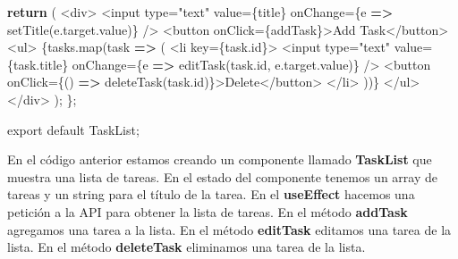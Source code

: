 \documentclass[
  a4paper,
  DIV=11,
  numbers=noendperiod,
  onepage,
  openany]{scrreprt}
\newenvironment{Shaded}{\begin{snugshade}}{\end{snugshade}}
\newcommand{\AttributeTok}[1]{\textcolor[rgb]{0.40,0.45,0.13}{#1}}
\newcommand{\ControlFlowTok}[1]{\textcolor[rgb]{0.00,0.23,0.31}{\textbf{#1}}}
\newcommand{\FunctionTok}[1]{\textcolor[rgb]{0.28,0.35,0.67}{#1}}
\newcommand{\ImportTok}[1]{\textcolor[rgb]{0.00,0.46,0.62}{#1}}
\newcommand{\KeywordTok}[1]{\textcolor[rgb]{0.00,0.23,0.31}{\textbf{#1}}}
\newcommand{\NormalTok}[1]{\textcolor[rgb]{0.00,0.23,0.31}{#1}}
\newcommand{\OperatorTok}[1]{\textcolor[rgb]{0.37,0.37,0.37}{#1}}
\newcommand{\StringTok}[1]{\textcolor[rgb]{0.13,0.47,0.30}{#1}}
\begin{document}
\begin{tcolorbox}
\begin{Shaded}
\begin{Highlighting}[]
  \ControlFlowTok{return}\NormalTok{ (}
    \OperatorTok{\textless{}}\NormalTok{div}\OperatorTok{\textgreater{}}
      \OperatorTok{\textless{}}\NormalTok{input type}\OperatorTok{=}\StringTok{"text"}\NormalTok{ value}\OperatorTok{=}\NormalTok{\{title\} onChange}\OperatorTok{=}\NormalTok{\{e }\KeywordTok{=\textgreater{}} \FunctionTok{setTitle}\NormalTok{(e}\OperatorTok{.}\AttributeTok{target}\OperatorTok{.}\AttributeTok{value}\NormalTok{)\} }\OperatorTok{/\textgreater{}}
      \OperatorTok{\textless{}}\NormalTok{button onClick}\OperatorTok{=}\NormalTok{\{addTask\}}\OperatorTok{\textgreater{}}\NormalTok{Add Task}\OperatorTok{\textless{}/}\NormalTok{button}\OperatorTok{\textgreater{}}
      \OperatorTok{\textless{}}\NormalTok{ul}\OperatorTok{\textgreater{}}
\NormalTok{        \{tasks}\OperatorTok{.}\FunctionTok{map}\NormalTok{(task }\KeywordTok{=\textgreater{}}\NormalTok{ (}
          \OperatorTok{\textless{}}\NormalTok{li key}\OperatorTok{=}\NormalTok{\{task}\OperatorTok{.}\AttributeTok{id}\NormalTok{\}}\OperatorTok{\textgreater{}}
            \OperatorTok{\textless{}}\NormalTok{input type}\OperatorTok{=}\StringTok{"text"}\NormalTok{ value}\OperatorTok{=}\NormalTok{\{task}\OperatorTok{.}\AttributeTok{title}\NormalTok{\} onChange}\OperatorTok{=}\NormalTok{\{e }\KeywordTok{=\textgreater{}} \FunctionTok{editTask}\NormalTok{(task}\OperatorTok{.}\AttributeTok{id}\OperatorTok{,}\NormalTok{ e}\OperatorTok{.}\AttributeTok{target}\OperatorTok{.}\AttributeTok{value}\NormalTok{)\} }\OperatorTok{/\textgreater{}}
            \OperatorTok{\textless{}}\NormalTok{button onClick}\OperatorTok{=}\NormalTok{\{() }\KeywordTok{=\textgreater{}} \FunctionTok{deleteTask}\NormalTok{(task}\OperatorTok{.}\AttributeTok{id}\NormalTok{)\}}\OperatorTok{\textgreater{}}\NormalTok{Delete}\OperatorTok{\textless{}/}\NormalTok{button}\OperatorTok{\textgreater{}}
          \OperatorTok{\textless{}/}\NormalTok{li}\OperatorTok{\textgreater{}}
\NormalTok{        ))\}}
      \OperatorTok{\textless{}/}\NormalTok{ul}\OperatorTok{\textgreater{}}
    \OperatorTok{\textless{}/}\NormalTok{div}\OperatorTok{\textgreater{}}
\NormalTok{  )}\OperatorTok{;}
\NormalTok{\}}\OperatorTok{;}

\ImportTok{export} \ImportTok{default}\NormalTok{ TaskList}\OperatorTok{;}
\end{Highlighting}
\end{Shaded}

En el código anterior estamos creando un componente llamado
\textbf{TaskList} que muestra una lista de tareas. En el estado del
componente tenemos un array de tareas y un string para el título de la
tarea. En el \textbf{useEffect} hacemos una petición a la API para
obtener la lista de tareas. En el método \textbf{addTask} agregamos una
tarea a la lista. En el método \textbf{editTask} editamos una tarea de
la lista. En el método \textbf{deleteTask} eliminamos una tarea de la
lista.


\end{tcolorbox}
\end{document}
